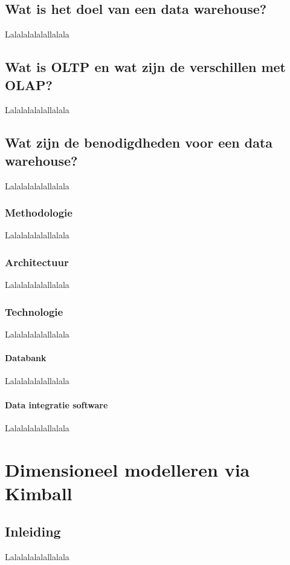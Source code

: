 \subsection{Wat is het doel van een data warehouse?}
Lalalalalalallalala

\subsection{Wat is OLTP en wat zijn de verschillen met OLAP?}
\label{sec:oltp-vs-olap}
Lalalalalalallalala

\subsection{Wat zijn de benodigdheden voor een data warehouse?}
Lalalalalalallalala

\subsubsection{Methodologie}
Lalalalalalallalala

\subsubsection{Architectuur}
Lalalalalalallalala

\subsubsection{Technologie}
Lalalalalalallalala

\paragraph{Databank}
Lalalalalalallalala

\paragraph{Data integratie software}
Lalalalalalallalala

\section{Dimensioneel modelleren via Kimball}

\subsection{Inleiding}
Lalalalalalallalala

